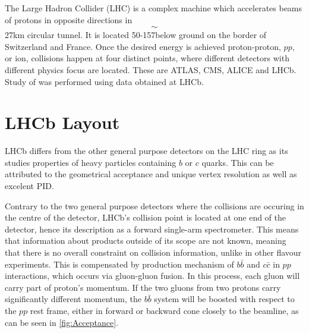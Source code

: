 The Large Hadron Collider (LHC) is a complex machine which accelerates beams of protons in opposite directions in $$\sim$$ 27km circular tunnel. It is located
50-157\m below ground on the border of Switzerland and France. Once the desired energy is achieved proton-proton, $pp$, or ion, collisions happen at four distinct points, where different detectors with different physics focus are located. These are \Gls{ATLAS}, \Gls{CMS}, \Gls{ALICE} and \Gls{LHCb}. 
Study of \Bmumumu was performed using data obtained at \Gls{LHCb}. 

\section{LHCb Layout}

\Gls{LHCb} differs from the other general purpose detectors on the LHC ring as its studies properties of heavy particles containing $b$ or $c$ quarks. This can be attributed to the geometrical acceptance and unique vertex resolution as well as excelent \Gls{PID}.

Contrary to the two general purpose detectors where the collisions are occuring in the centre of the detector, \Gls{LHCb}'s collision point is located at one end of the detector, hence its description as a forward single-arm spectrometer. This means that information about products outside of its scope are not known, meaning that there is no overall constraint on collision information, unlike in other flavour experiments. This is compensated by production mechanism of $b\bar{b}$ and $c\bar{c}$ in $pp$ interactions, which occurs via gluon-gluon fusion. In this process, each gluon will carry part of proton's momentum. If the two gluons from two protons carry significantly different momentum, the $b\bar{b}$ system will be boosted with respect to the $pp$ rest frame, either in forward or backward cone closely to the beamline, as can be seen in \autoref{fig:Acceptance}.

